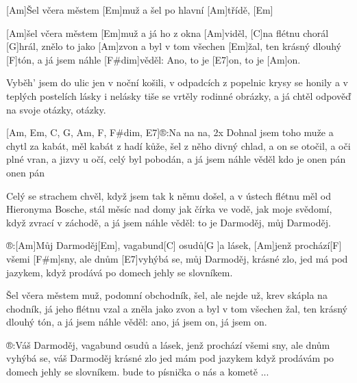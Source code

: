 
[Am]\null Šel včera městem [Em]muž 
a šel po hlavní [Am]třídě, [Em]

[Am]\null šel včera městem [Em]muž 
a já ho z okna [Am]viděl,
[C]na flétnu chorál [G]hrál, 
znělo to jako [Am]zvon
a byl v tom všechen [Em]\null žal, 
ten krásný dlouhý [F]tón,
a já jsem náhle [F#dim]věděl: 
Ano, to je [E7]on, to je [Am]on.

Vyběh' jsem do ulic jen v noční košili,
v odpadcích z popelnic krysy se honily
a v teplých postelích lásky i nelásky
tiše se vrtěly rodinné obrázky,
a já chtěl odpověď na svoje otázky, otázky.

[Am, Em, C, G, Am, F, F#dim, E7]\null®:Na na na, 2x
Dohnal jsem toho muže a chytl za kabát,
měl kabát z hadí kůže, šel z něho divný chlad,
a on se otočil, a oči plné vran,
a jizvy u očí, celý byl pobodán,
a já jsem náhle věděl kdo je onen pán onen pán

Celý se strachem chvěl, 
když jsem tak k němu došel,
a v ústech flétnu měl od Hieronyma Bosche,
stál měsíc nad domy jak čírka ve vodě,
jak moje svědomí, když zvrací v záchodě,
a já jsem náhle věděl: 
to je Darmoděj, můj Darmoděj.

®:[Am]Můj Darmoděj[Em], 
vagabund[C] osudů[G ]a lásek,
[Am]jenž prochází[F] všemi [F#m]sny, 
ale dnům [E7]vyhýbá se,
můj Darmoděj, krásné zlo, 
jed má pod jazykem,
když prodává po domech jehly se slovníkem.

Šel včera městem muž, podomní obchodník,
šel, ale nejde už, krev skápla na chodník,
já jeho flétnu vzal a zněla jako zvon
a byl v tom všechen žal, ten krásný dlouhý tón,
a já jsem náhle věděl: 
ano, já jsem on, já jsem on.

®:Váš Darmoděj, vagabund osudů a lásek,
jenž prochází všemi sny, ale dnům vyhýbá se,
váš Darmoděj krásné zlo jed mám pod jazykem
když prodávám po domech jehly se slovníkem.
bude to písnička o nás a kometě ...